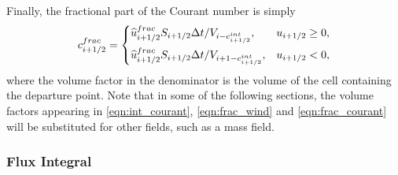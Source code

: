\documentclass{ametsocV6.1}
\begin{document}
Finally, the fractional part of the Courant number is simply
\begin{equation} \label{eqn:frac_courant}
c^{frac}_{i+1/2} =
\begin{dcases}
\widehat{u}^{frac}_{i+1/2} S_{i+1/2}\Delta t / V_{i-c^{int}_{i+1/2}}, & u_{i+1/2} \geq 0, \\
\widehat{u}^{frac}_{i+1/2} S_{i+1/2}\Delta t / V_{i+1-c^{int}_{i+1/2}}, & u_{i+1/2} < 0,
\end{dcases}
\end{equation}
where the volume factor in the denominator is the volume of the cell containing the departure point.
Note that in some of the following sections, the volume factors appearing in \eqref{eqn:int_courant}, \eqref{eqn:frac_wind} and \eqref{eqn:frac_courant} will be substituted for other fields, such as a mass field.

\subsubsection{Flux Integral} \label{sec:ffsl_flux_integral}
\end{document}
